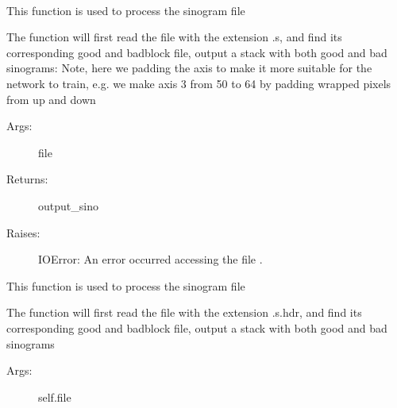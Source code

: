 \documentclass[letterpaper,10pt,english]{sphinxmanual}
\begin{document}
\begin{fulllineitems}
\label{\detokenize{usage/data:sino_process_tof.Sinogram_Processor}}~

\begin{fulllineitems}
\label{\detokenize{usage/data:sino_process_tof.Sinogram_Processor.process_data}}
This function is used to process the sinogram file

The function will first read the file with the extension .s,
and find its corresponding good and badblock file, output a stack
with both good and bad sinograms: Note, here we padding the axis
to make it more suitable for the network to train, e.g. we make axis
3 from 50 to 64 by padding wrapped pixels from up and down
\begin{description}
\item[{Args:}] \leavevmode
file

\item[{Returns:}] \leavevmode
output\_sino

\item[{Raises:}] \leavevmode
IOError: An error occurred accessing the file .

\end{description}

\end{fulllineitems}


\begin{fulllineitems}
\label{\detokenize{usage/data:sino_process_tof.Sinogram_Processor.process_sino_file}}
This function is used to process the sinogram file

The function will first read the file with the extension .s.hdr,
and find its corresponding good and badblock file, output a stack
with both good and bad sinograms
\begin{description}
\item[{Args:}] \leavevmode
self.file


\end{description}
\end{fulllineitems}
\end{fulllineitems}
\end{document}
